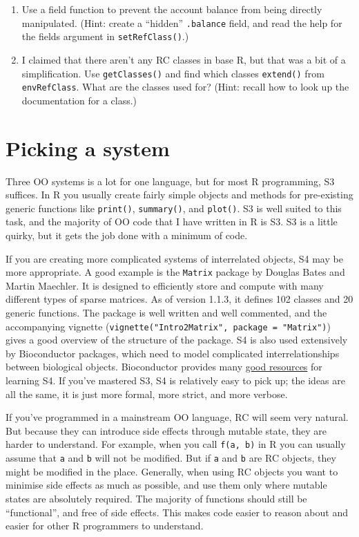 \begin{enumerate}
\def\labelenumi{\arabic{enumi}.}
\item
  Use a field function to prevent the account balance from being
  directly manipulated. (Hint: create a ``hidden'' \texttt{.balance}
  field, and read the help for the fields argument in
  \texttt{setRefClass()}.)
\item
  I claimed that there aren't any RC classes in base R, but that was a
  bit of a simplification. Use \texttt{getClasses()} and find which
  classes \texttt{extend()} from \texttt{envRefClass}. What are the
  classes used for? (Hint: recall how to look up the documentation for a
  class.)
\end{enumerate}

\hypertarget{picking-a-system}{%
\section{Picking a system}\label{picking-a-system}}

Three OO systems is a lot for one language, but for most R programming,
S3 suffices. In R you usually create fairly simple objects and methods
for pre-existing generic functions like \texttt{print()},
\texttt{summary()}, and \texttt{plot()}. S3 is well suited to this task,
and the majority of OO code that I have written in R is S3. S3 is a
little quirky, but it gets the job done with a minimum of code.

If you are creating more complicated systems of interrelated objects, S4
may be more appropriate. A good example is the \texttt{Matrix} package
by Douglas Bates and Martin Maechler. It is designed to efficiently
store and compute with many different types of sparse matrices. As of
version 1.1.3, it defines 102 classes and 20 generic functions. The
package is well written and well commented, and the accompanying
vignette (\texttt{vignette("Intro2Matrix",\ package\ =\ "Matrix")})
gives a good overview of the structure of the package. S4 is also used
extensively by Bioconductor packages, which need to model complicated
interrelationships between biological objects. Bioconductor provides
many \href{https://www.google.com/search?q=bioconductor+s4}{good
resources} for learning S4. If you've mastered S3, S4 is relatively easy
to pick up; the ideas are all the same, it is just more formal, more
strict, and more verbose.

If you've programmed in a mainstream OO language, RC will seem very
natural. But because they can introduce side effects through mutable
state, they are harder to understand. For example, when you call
\texttt{f(a,\ b)} in R you can usually assume that \texttt{a} and
\texttt{b} will not be modified. But if \texttt{a} and \texttt{b} are RC
objects, they might be modified in the place. Generally, when using RC
objects you want to minimise side effects as much as possible, and use
them only where mutable states are absolutely required. The majority of
functions should still be ``functional'', and free of side effects. This
makes code easier to reason about and easier for other R programmers to
understand.


